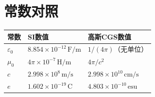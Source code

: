 \documentclass[11pt,a4paper,openany,oneside]{book}
\newcommand{\eps}{\varepsilon}
\newcommand{\muz}{\mu_0}
\begin{document}
\section{常数对照}

\begin{center}
\begin{tabular}{@{}lll@{}}
\toprule
\textbf{常数} & \textbf{SI数值} & \textbf{高斯CGS数值} \\
\midrule
$\eps_0$ & $8.854\times 10^{-12}\,\text{F/m}$ & $1/(4\pi)$（无单位） \\
$\muz$ & $4\pi\times 10^{-7}\,\text{H/m}$ & $4\pi/c^2$ \\
$c$ & $2.998\times 10^8\,\text{m/s}$ & $2.998\times 10^{10}\,\text{cm/s}$ \\
$e$ & $1.602\times 10^{-19}\,\text{C}$ & $4.803\times 10^{-10}\,\text{esu}$ \\
\bottomrule
\end{tabular}
\end{center}



\end{document}
